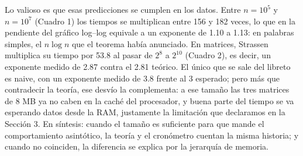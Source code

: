 Lo valioso es que esas predicciones se cumplen en los datos. Entre $n=10^5$ y
$n=10^7$ (Cuadro 1) los tiempos se multiplican entre 156 y 182 veces, lo que en
la pendiente del gráfico log--log equivale a un exponente de 1.10 a 1.13: en
palabras simples, el $n \log n$ que el teorema había anunciado. En matrices,
Strassen multiplica su tiempo por 53.8 al pasar de $2^8$ a $2^{10}$
(Cuadro 2), es decir, un exponente medido de 2.87 contra el 2.81 teórico.
El único que se sale del libreto es naive, con un exponente medido de 3.8
frente al 3 esperado; pero más que contradecir la teoría, ese desvío la
complementa: a ese tamaño las tres matrices de 8 MB ya no caben en la caché del
procesador, y buena parte del tiempo se va esperando datos desde la RAM,
justamente la limitación que declaramos en la Sección 3. En síntesis: cuando el
tamaño es suficiente para que mande el comportamiento asintótico, la teoría y el
cronómetro cuentan la misma historia; y cuando no coinciden, la diferencia se
explica por la jerarquía de memoria.